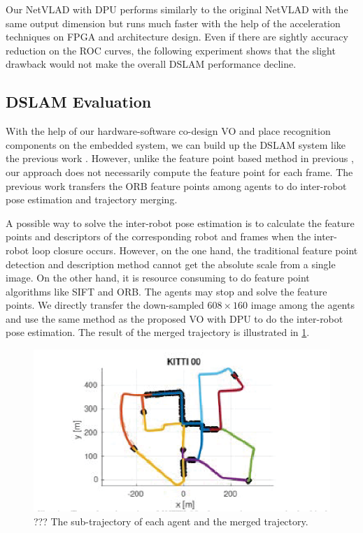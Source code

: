 Our NetVLAD with DPU performs similarly to the original NetVLAD with the same output dimension but runs much faster with the help of the acceleration techniques on FPGA and architecture design. Even if there are sightly accuracy reduction on the ROC curves, the following experiment shows that the slight drawback would not make the overall DSLAM performance decline.

\subsection{DSLAM Evaluation}

With the help of our hardware-software co-design VO and place recognition components on the embedded system, we can build up the DSLAM system like the previous work \cite{Cieslewski:20187ee}. However, unlike the feature point based method in previous \cite{Cieslewski:20187ee}, our approach does not necessarily compute the feature point for each frame. The previous work \cite{Cieslewski:20187ee} transfers the ORB feature points among agents to do inter-robot pose estimation and trajectory merging.


A possible way to solve the inter-robot pose estimation is to calculate the feature points and descriptors of the corresponding robot and frames when the inter-robot loop closure occurs. However, on the one hand, the traditional feature point detection and description method cannot get the absolute scale from a single image. On the other hand, it is resource consuming to do feature point algorithms like SIFT\cite{Jegou:2010f45} and ORB\cite{Mur-Artal:2017281}. The agents may stop and solve the feature points. We directly transfer the down-sampled $608 \times 160$ image among the agents and use the same method as the proposed VO with DPU to do the inter-robot pose estimation. The result of the merged trajectory is illustrated in \cref{fig:dslam}.


\begin{figure}[ht]
  \centering  
  \includegraphics[width=0.85\linewidth]{fig/dslam.eps}
  \caption{??? The sub-trajectory of each agent and the merged trajectory.}
  \label{fig:dslam}
\end{figure}

